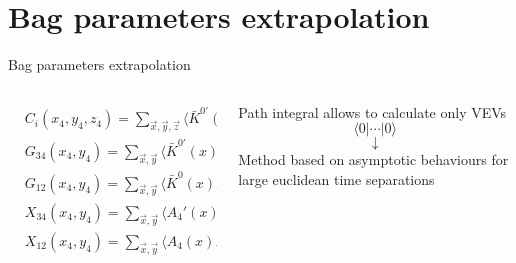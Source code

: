 \documentclass{beamer}
\newcommand{\la}{\langle}
\newcommand{\ra}{\rangle}
\begin{document}
\section{Bag parameters extrapolation}

\begin{frame}{Bag parameters extrapolation}
      \begin{columns}
            \begin{column}{0.5\textwidth}
                  \begin{equation*}
                        \begin{split}
                              & C_i (x_4,y_4,z_4) = \sum_{\vec x,\vec y,\vec z}     \la \bar K^{0'}(x)O_{i[+]}(y)\bar K^{0} (z) \ra  \\
                              & G_{34} (x_4,y_4) = \sum_{\vec x,\vec y}             \la \bar K^{0'} (x) K^{0'} (y)              \ra \\
                              & G_{12} (x_4,y_4) = \sum_{\vec x,\vec y}             \la \bar K^{0} (x) K^{0} (y)                \ra \\
                              & X_{34} (x_4,y_4) = \sum_{\vec x,\vec y}             \la      A_{4}' (x) K^{0'} (y)              \ra \\
                              & X_{12} (x_4,y_4) = \sum_{\vec x,\vec y}             \la      A_{4} (x) K^{0} (y)                \ra \\          
                        \end{split}
                  \end{equation*}
            \end{column}
            \begin{column}{0.5\textwidth}
                  \begin{center}
                        Path integral allows to calculate only VEVs$$\la 0 | \cdots | 0 \ra$$
                        $$\downarrow$$
                        Method based on asymptotic behaviours for large euclidean time separations
                  \end{center}
            \end{column}
      \end{columns}
\end{frame}
\end{document}
